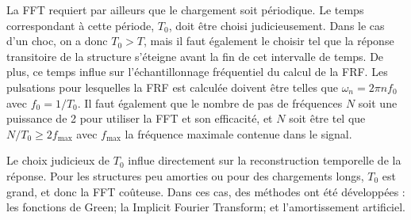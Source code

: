 La FFT requiert par ailleurs que le chargement soit périodique. Le temps correspondant à cette période, $T_0$, doit être choisi judicieusement. Dans le cas d'un choc, on a donc $T_0 > T$, mais il faut également le choisir tel que la réponse transitoire de la structure s'éteigne avant la fin de cet intervalle de temps. De plus, ce temps influe sur l'échantillonnage fréquentiel du calcul de la FRF. Les pulsations pour lesquelles la FRF est calculée doivent être telles que $\omega_n=2\pi n f_0$ avec $f_0=1/T_0$. Il faut également que le nombre de pas de fréquences $N$ soit une puissance de 2 pour utiliser la FFT et son efficacité, et $N$ soit être tel que $N/T_0 \ge 2 f_{\max}$ avec $f_{\max}$ la fréquence maximale contenue dans le signal.

\medskip
Le choix judicieux de $T_0$ influe directement sur la reconstruction temporelle de la réponse. Pour les structures peu amorties ou pour des chargements longs, $T_0$ est grand, et donc la FFT coûteuse. Dans ces cas, des méthodes ont été développées : les fonctions de Green; la Implicit Fourier Transform; et l'amortissement artificiel.

